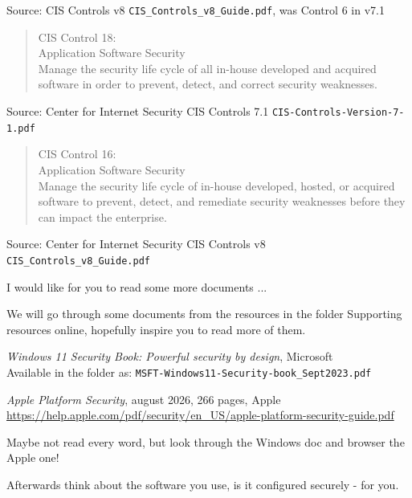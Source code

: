 \documentclass[Screen16to9,17pt]{foils}
\begin{document}
Source: CIS Controls v8 \verb+CIS_Controls_v8_Guide.pdf+, was Control 6 in v7.1



\begin{quote}
CIS Control 18:\\
Application Software Security\\
Manage the security life cycle of all in-house developed and acquired software in order to prevent, detect, and correct security weaknesses.
\end{quote}

Source: Center for Internet Security CIS Controls 7.1 \verb+CIS-Controls-Version-7-1.pdf+

\begin{quote}
CIS Control 16:\\
Application Software Security\\
Manage the security life cycle of in-house developed, hosted,
or acquired software to prevent, detect, and remediate security
weaknesses before they can impact the enterprise.
\end{quote}

Source: Center for Internet Security CIS Controls v8 \verb+CIS_Controls_v8_Guide.pdf+



I would like for you to read some more documents ...

We will go through some documents from the resources in the folder Supporting resources online, hopefully inspire you to read more of them.

\begin{list1}
\item  \emph{Windows 11 Security Book: Powerful security by design}, Microsoft \\
Available in the folder as: \verb+MSFT-Windows11-Security-book_Sept2023.pdf+
\item \emph{Apple Platform Security}, august 2026, 266 pages, Apple\\
\url{https://help.apple.com/pdf/security/en_US/apple-platform-security-guide.pdf}
\end{list1}

Maybe not read every word, but look through the Windows doc and browser the Apple one!

Afterwards think about the software you use, is it configured securely - for you.

\end{document}
